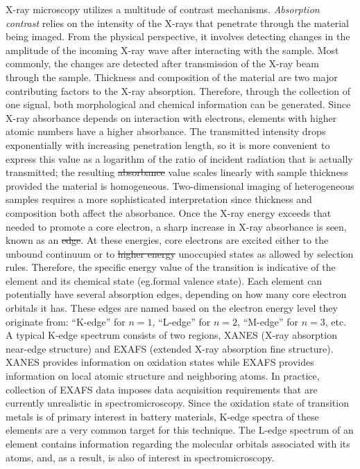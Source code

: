 \documentclass[journal=cmatex,manuscript=perspective]{achemso}
\providecommand{\DIFaddtex}[1]{{\protect\color{blue}\uwave{#1}}} %
\providecommand{\DIFdeltex}[1]{{\protect\color{red}\sout{#1}}}                      %
\providecommand{\DIFaddbegin}{} %
\providecommand{\DIFaddend}{} %
\providecommand{\DIFdelbegin}{} %
\providecommand{\DIFdelend}{} %
\providecommand{\DIFadd}[1]{\texorpdfstring{\DIFaddtex{#1}}{#1}} %
\providecommand{\DIFdel}[1]{\texorpdfstring{\DIFdeltex{#1}}{}} %
\begin{document}
X-ray microscopy utilizes a multitude of contrast
mechanisms. \emph{Absorption contrast} relies on the intensity of the
X-rays that penetrate through the material being imaged. From the
physical perspective, it involves detecting changes in the amplitude
of the incoming X-ray wave after interacting with the sample. Most
commonly, the changes are detected after transmission of the X-ray
beam through the sample. Thickness and composition of the material are
two major contributing factors to the X-ray absorption. Therefore,
through the collection of one signal, both morphological and chemical
information can be generated. Since X-ray absorbance depends on
interaction with electrons, elements with higher atomic numbers have a
higher absorbance. The transmitted intensity drops exponentially with
increasing penetration length, so it is more convenient to express
this value as a logarithm of the ratio of incident radiation that is
actually transmitted; the resulting \DIFdelbegin \DIFdel{absorbance }\DIFdelend \DIFaddbegin \emph{\DIFadd{optical depth}} \DIFaddend value scales
linearly with sample thickness provided the material is
homogeneous. Two-dimensional imaging of heterogeneous samples requires
a more sophisticated interpretation since thickness and composition
both affect the absorbance. Once the X-ray energy exceeds that needed
to promote a core electron, a sharp increase in X-ray absorbance is
seen, known as an \DIFdelbegin \DIFdel{edge}\DIFdelend \DIFaddbegin \DIFadd{``edge''}\DIFaddend . At these energies, core electrons are
excited either to the unbound continuum or to \DIFdelbegin \DIFdel{higher energy }\DIFdelend \DIFaddbegin \DIFadd{higher-energy }\DIFaddend unoccupied
states as allowed by selection rules. Therefore, the specific energy
value of the transition is indicative of the element and its chemical
state (eg.\DIFaddbegin \DIFadd{\ }\DIFaddend formal valence state). Each element can potentially have
several absorption edges, depending on how many core electron orbitals
it has. These edges are named based on the electron energy level they
originate from: ``K-edge'' for $n=1$, ``L-edge'' for $n=2$, ``M-edge''
for $n=3$, etc. A typical K-edge spectrum consists of two regions,
XANES (X-ray absorption near-edge structure) and EXAFS (extended X-ray
absorption fine structure). XANES provides information on oxidation
states while EXAFS provides information on local atomic structure and
neighboring atoms. In practice, collection of EXAFS data imposes data
acquisition requirements that are currently unrealistic in
spectromicroscopy. Since the oxidation state of transition metals is
of primary interest in battery materials, K-edge spectra of these
elements are a very common target for this technique. The L-edge
spectrum of an element contains information regarding the molecular
orbitals associated with its atoms, and, as a result, is also of
interest in spectromicroscopy.
\end{document}
